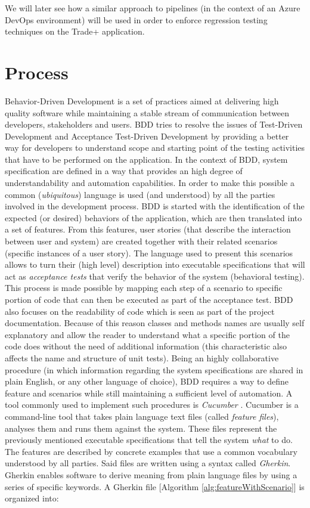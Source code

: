 We will later see how a similar approach to pipelines (in the context of an Azure DevOps environment) will be used in order to enforce regression testing techniques on the Trade+ application.

\section{Process} 

Behavior-Driven Development \cite{BDD} is a set of practices aimed at delivering high quality software while maintaining a stable stream of communication between developers, stakeholders and users. BDD tries to resolve the issues of Test-Driven Development and Acceptance Test-Driven Development by providing a better way for developers to understand scope and starting point of the testing activities that have to be performed on the application.
In the context of BDD, system specification are defined in a way that provides an high degree of understandability and automation capabilities. In order to make this possible a common (\textit{ubiquitous}) language is used (and understood) by all the parties involved in the development process.
BDD is started with the identification of the expected (or desired) behaviors of the application, which are then translated into a set of features. From this features, user stories (that describe the interaction between user and system) are created together with their related scenarios (specific instances of a user story). The language used to present this scenarios allows to turn their (high level) description into executable specifications that will act as \textit{acceptance tests} that verify the behavior of the system (behavioral testing). This process is made possible by mapping each step of a scenario to specific portion of code that can then be executed as part of the acceptance test.
BDD also focuses on the readability of code which is seen as part of the project documentation. Because of this reason classes and methods names are usually self explanatory and allow the reader to understand what a specific portion of the code does without the need of additional information (this characteristic also affects the name and structure of unit tests).
Being an highly collaborative procedure (in which information regarding the system specifications are shared in plain English, or any other language of choice), BDD requires a way to define feature and scenarios while still maintaining a sufficient level of automation. A tool commonly used to implement such procedures is \textit{Cucumber} \cite{Cucumber}. Cucumber is a command-line tool that takes plain language text files (called \textit{feature files}), analyses them and runs them against the system. These files represent the previously mentioned executable specifications that tell the system \textit{what} to do. The features are described by concrete examples that use a common vocabulary understood by all parties. Said files are written using a syntax called \textit{Gherkin}. Gherkin enables software to derive meaning from plain language files by using a series of specific keywords. A Gherkin file [Algorithm \ref{alg:featureWithScenario}] is organized into:

